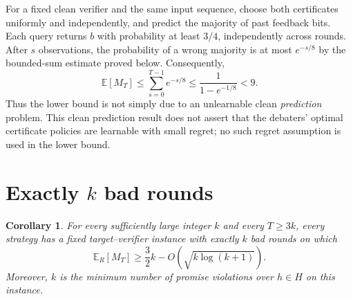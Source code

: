 \documentclass[11pt]{article}
\newcommand{\E}{\mathbb{E}}
\newtheorem{corollary}[theorem]{Corollary}
\theoremstyle{remark}
\begin{document}
For a fixed clean verifier and the same input sequence, choose both
certificates uniformly and independently, and predict the majority of past
feedback bits. Each query returns $b$ with probability at least $3/4$,
independently across rounds. After $s$ observations, the probability of a
wrong majority is at most $e^{-s/8}$ by the bounded-sum estimate proved below.
Consequently,
\[
 \E[M_T]\le\sum_{s=0}^{T-1}e^{-s/8}
          \le\frac{1}{1-e^{-1/8}}<9.
\]
Thus the lower bound is not simply due to an unlearnable clean
\emph{prediction} problem. This clean prediction result does not assert that
the debaters' optimal certificate policies are learnable with small regret;
no such regret assumption is used in the lower bound.

\clearpage
\appendix
\section{Exactly \texorpdfstring{$k$}{k} bad rounds}\label{sec:exact}

\begin{corollary}\label{cor:exact}
For every sufficiently large integer $k$ and every $T\ge 3k$, every strategy
has a fixed target--verifier instance with exactly $k$ bad rounds on which
\[
       \boxed{\E_R[M_T]\ge
       \frac32 k-O\!\left(\sqrt{k\log(k+1)}\right).}
\]
Moreover, $k$ is the minimum number of promise violations over $h\in H$ on
this instance.
\end{corollary}
\end{document}
